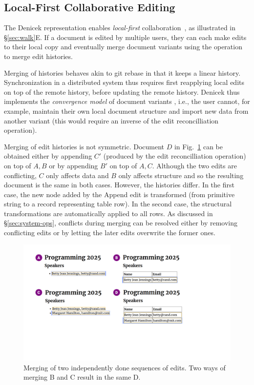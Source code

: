 \documentclass[sigconf,anonymous,screen]{acmart}
\newcommand{\ident}[1]{{\sffamily #1}}
\begin{document}
\subsection{Local-First Collaborative Editing}
\label{sec:impl-collab}

The Denicek representation enables \emph{local-first} collaboration~\cite{kleppmann-2019-local},
as illustrated in \S\ref{sec:walk}E. If a document is edited by multiple users, they can
each make edits to their local copy and eventually merge document variants using the operation to
merge edit histories.

Merging of histories behaves akin to git rebase in that it keeps a linear history. Synchronization
in a distributed system thus requires first reapplying local edits on top of the remote history,
before updating the remote history. Denicek thus implements the \emph{convergence model} of
document variants \cite{edwards-2025-schema}, i.e., the user cannot, for example, maintain their
own local document structure and import new data from another variant (this would require an
inverse of the edit reconcilliation operation).

Merging of edit histories is not symmetric. Document $D$ in Fig.~\ref{fig:merging}
can be obtained either by appending $C'$ (produced by the edit reconcilliation operation)
on top of $A,B$ or by appending $B'$ on top of $A,C$. Although the two edits are conflicting,
$C$ only affects data and $B$ only affects structure and so the resulting document is the same
in both cases. However, the histories differ. In the first case, the new node added by the
\ident{Append} edit is transformed (from primitive string to a record representing table row).
In the second case, the structural transformations are automatically applied to all rows.
As discussed in \S\ref{sec:system-ops}, conflicts during merging can be resolved either by
removing conflicting edits or by letting the later edits overwrite the former ones.


\begin{figure}[t]
\includegraphics[width=0.9\columnwidth,clip,trim=1.7cm 6cm 7.8cm 1.5cm]{fig/merging.pdf}
\vspace{-0.5em}
\caption{Merging of two independently done sequences of edits. Two ways of merging B and C result in the same D.}
\label{fig:merging}
\vspace{-0.5em}
\end{figure}
\end{document}
